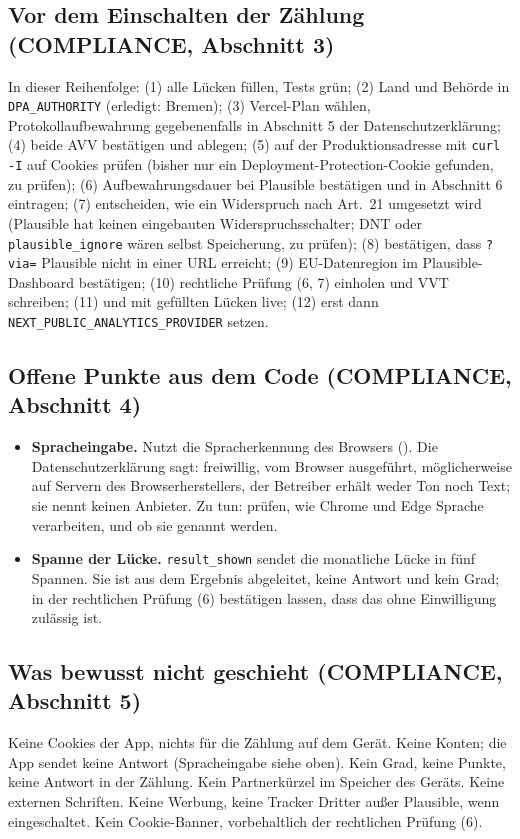 \documentclass[10pt,parskip=half-]{scrartcl}
\begin{document}
\subsection{Vor dem Einschalten der Zählung (COMPLIANCE, Abschnitt 3)}
In dieser Reihenfolge: (1) alle Lücken füllen, Tests grün; (2) Land und Behörde in
\texttt{DPA\_AUTHORITY} (erledigt: Bremen); (3) Vercel-Plan wählen, Protokollaufbewahrung gegebenenfalls in
Abschnitt 5 der Datenschutzerklärung; (4) beide AVV bestätigen und ablegen; (5) auf der
Produktionsadresse mit \texttt{curl -I} auf Cookies prüfen (bisher nur ein Deployment-Protection-Cookie gefunden, zu
prüfen); (6) Aufbewahrungsdauer bei
Plausible bestätigen und in Abschnitt 6 eintragen; (7) entscheiden, wie ein Widerspruch nach
Art.~21 umgesetzt wird (Plausible hat keinen eingebauten Widerspruchsschalter; DNT oder
\texttt{plausible\_ignore} wären selbst Speicherung, zu prüfen); (8) bestätigen, dass \texttt{?via=} Plausible nicht in einer URL
erreicht; (9) EU-Datenregion im Plausible-Dashboard bestätigen; (10) rechtliche Prüfung (6, 7)
einholen und VVT schreiben; (11)  und  mit gefüllten
Lücken live; (12) erst dann \texttt{NEXT\_PUBLIC\_ANALYTICS\_PROVIDER} setzen.

\subsection{Offene Punkte aus dem Code (COMPLIANCE, Abschnitt 4)}
\begin{itemize}
  \item \textbf{Spracheingabe.} Nutzt die Spracherkennung des Browsers
    (). Die Datenschutzerklärung sagt: freiwillig, vom Browser
    ausgeführt, möglicherweise auf Servern des Browserherstellers, der Betreiber erhält weder Ton
    noch Text; sie nennt keinen Anbieter. Zu tun: prüfen, wie Chrome und Edge Sprache
    verarbeiten, und ob sie genannt werden.
  \item \textbf{Spanne der Lücke.} \texttt{result\_shown} sendet die monatliche Lücke in fünf
    Spannen. Sie ist aus dem Ergebnis abgeleitet, keine Antwort und kein Grad; in der
    rechtlichen Prüfung (6) bestätigen lassen, dass das ohne Einwilligung zulässig ist.
\end{itemize}

\subsection{Was bewusst nicht geschieht (COMPLIANCE, Abschnitt 5)}
Keine Cookies der App, nichts für die Zählung auf dem Gerät. Keine Konten; die App sendet
keine Antwort (Spracheingabe siehe oben). Kein Grad, keine Punkte, keine Antwort in der
Zählung. Kein Partnerkürzel im Speicher des Geräts. Keine externen Schriften. Keine Werbung,
keine Tracker Dritter außer Plausible, wenn eingeschaltet. Kein Cookie-Banner, vorbehaltlich
der rechtlichen Prüfung (6).
\end{document}
